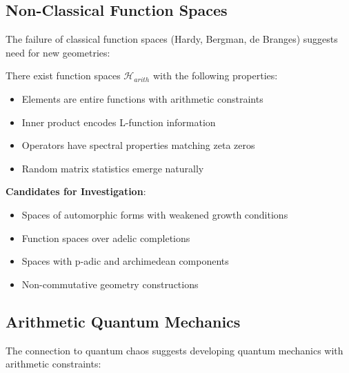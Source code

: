 \subsection{Non-Classical Function Spaces}
\label{subsec:nonclassical_spaces}

The failure of classical function spaces (Hardy, Bergman, de Branges) suggests need for new geometries:

\begin{conjecture}
There exist function spaces $\mathcal{H}_{arith}$ with the following properties:
\begin{itemize}
\item Elements are entire functions with arithmetic constraints
\item Inner product encodes L-function information
\item Operators have spectral properties matching zeta zeros
\item Random matrix statistics emerge naturally
\end{itemize}
\end{conjecture}

\begin{research_direction}
\textbf{Candidates for Investigation}:
\begin{itemize}
\item Spaces of automorphic forms with weakened growth conditions
\item Function spaces over adelic completions
\item Spaces with p-adic and archimedean components
\item Non-commutative geometry constructions
\end{itemize}
\end{research_direction}

\subsection{Arithmetic Quantum Mechanics}
\label{subsec:arithmetic_quantum}

The connection to quantum chaos suggests developing quantum mechanics with arithmetic constraints:

